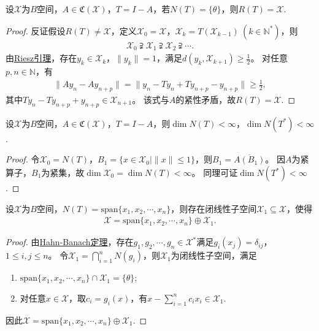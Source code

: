 \documentclass[../../main.tex]{subfiles}%
\begin{document}
\begin{theorem}\label{theorem:Fredholm定理结论1}
设$\mathscr{X}$为$B$空间，$A\in\mathfrak{C}(\mathscr{X})$，$T=I-A$，若$N(T)=\{\theta\}$，则$R(T)=\mathscr{X}$.
\end{theorem}
\begin{proof}
反证假设$R(T)\neq\mathscr{X}$，定义$\mathscr{X}_0=\mathscr{X}$，$\mathscr{X}_k=T(\mathscr{X}_{k-1})\ (k\in\mathbb{N}^*)$，则
\begin{align*}
\mathscr{X}_0\supsetneqq\mathscr{X}_1\supsetneqq\mathscr{X}_2\supsetneqq\cdots.
\end{align*}
由\hyperref[lemma:Riesz引理]{Riesz引理}，存在$y_k\in\mathscr{X}_k$，$\|y_k\|=1$，满足$d(y_k,\mathscr{X}_{k+1})\geqslant\frac{1}{2}$。
对任意$p,n\in\mathbb{N}$，有
\begin{align*}
\|Ay_n-Ay_{n+p}\|=\|y_n-Ty_n+Ty_{n+p}-y_{n+p}\|\geqslant\frac{1}{2},
\end{align*}
其中$Ty_n-Ty_{n+p}+y_{n+p}\in\mathscr{X}_{n+1}$。
该式与$A$的紧性矛盾，故$R(T)=\mathscr{X}$.
\end{proof}

\begin{lemma}
设$\mathscr{X}$为$B$空间，$A\in\mathfrak{C}(\mathscr{X})$，$T=I-A$，则$\dim N(T)<\infty$，$\dim N(T^*)<\infty$.
\end{lemma}
\begin{proof}
令$\mathscr{X}_0=N(T)$，$B_1=\{x\in\mathscr{X}_0\mid\|x\|\leqslant1\}$，则$B_1=\overline{A(B_1)}$。
因$A$为紧算子，$B_1$为紧集，故$\dim\mathscr{X}_0=\dim N(T)<\infty$。
同理可证$\dim N(T^*)<\infty$.
\end{proof}

\begin{lemma}
设$\mathscr{X}$为$B$空间，$N(T)=\mathrm{span}\{x_1,x_2,\cdots,x_n\}$，则存在闭线性子空间$\mathscr{X}_1\subseteq\mathscr{X}$，使得
\begin{align*}
\mathscr{X}=\mathrm{span}\{x_1,x_2,\cdots,x_n\}\oplus\mathscr{X}_1.
\end{align*}
\end{lemma}
\begin{proof}
由\hyperref[theorem:泛函分析--(哈恩-巴拿赫)Hahn-Banach定理]{Hahn-Banach定理}，存在$g_1,g_2,\cdots,g_n\in\mathscr{X}^*$满足$g_i(x_j)=\delta_{ij}$，$1\leqslant i,j\leqslant n$。
令$\mathscr{X}_1=\bigcap\limits_{i=1}^n N(g_i)$，则$\mathscr{X}_1$为闭线性子空间，满足
\begin{enumerate}[(1)]
\item $\mathrm{span}\{x_1,x_2,\cdots,x_n\}\cap\mathscr{X}_1=\{\theta\}$;
\item 对任意$x\in\mathscr{X}$，取$c_i=g_i(x)$，有$x-\sum\limits_{i=1}^n c_ix_i\in\mathscr{X}_1$.
\end{enumerate}
因此$\mathscr{X}=\mathrm{span}\{x_1,x_2,\cdots,x_n\}\oplus\mathscr{X}_1$.
\end{proof}
\end{document}
